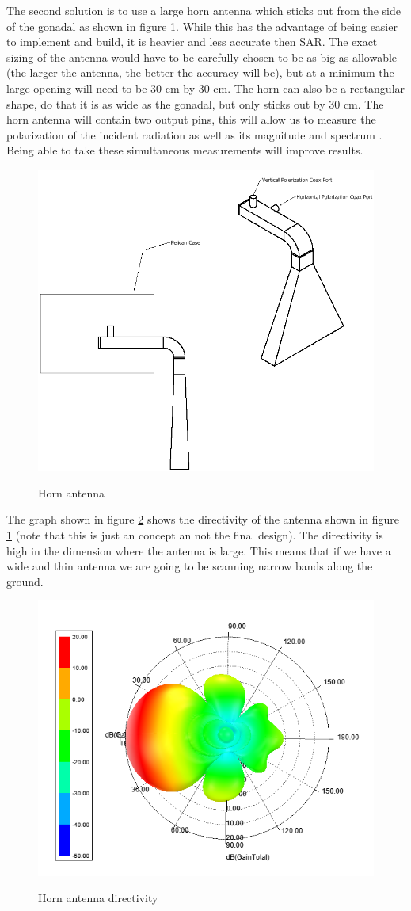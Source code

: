 \documentclass[12pt]{article}
\begin{document}
The second solution is to use a large horn antenna which sticks out from the side of the gonadal as shown in 
figure \ref{fig:antenna}. While this has the advantage of being easier to implement and build, it is heavier 
and less accurate then SAR. The exact sizing of the antenna would have to be carefully chosen to be as big
as allowable (the larger the antenna, the better the accuracy will be), but at a minimum the large opening will
need to be 30 cm by 30 cm. The horn can also be a rectangular shape, do that it is as wide as the gonadal, but 
only sticks out by 30 cm. The horn antenna will contain two output pins, this will allow us to measure the
polarization of the incident radiation as well as its magnitude and spectrum \cite{constantine2005antenna}.
Being able to take these simultaneous measurements will improve results.\\
\begin{figure}
	\centering
	\includegraphics[width=0.5\linewidth]{Figures/rough_antenna.png}
	\label{fig:antenna}
	\caption{Horn antenna}
\end{figure}
The graph shown in figure \ref{fig:antenna_direction} shows the directivity of the antenna shown in figure
\ref{fig:antenna} (note that this is just an concept an not the final design). The directivity is high in 
the dimension where the antenna is large. This means that if we have a wide and thin antenna we are going to 
be scanning narrow bands along the ground. 
\begin{figure}
	\centering
	\includegraphics[width=0.5\linewidth]{Figures/antenna_gain.png}
	\label{fig:antenna_direction}
	\caption{Horn antenna directivity}
\end{figure}
\end{document}
